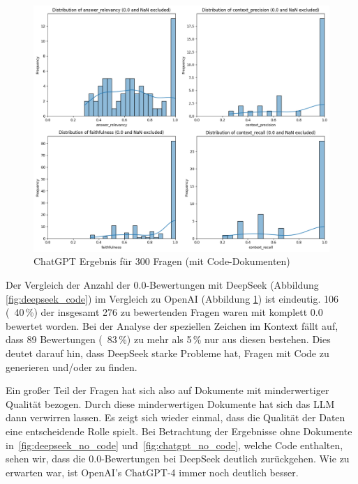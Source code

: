 \begin{figure}[!ht]
    \centering
    \includegraphics[width=1\textwidth]{images/127_44_code_invest_O_O}
    \caption[ChatGPT Metriken für 300 Fragen]{ChatGPT Ergebnis für 300 Fragen (mit Code-Dokumenten)}
    \label{fig:chatgpt_code}
\end{figure}
Der Vergleich der Anzahl der 0.0-Bewertungen mit DeepSeek (Abbildung \ref{fig:deepseek_code}) im Vergleich zu OpenAI (Abbildung \ref{fig:chatgpt_code}) ist eindeutig.
106 (~40\,\%) der insgesamt 276 zu bewertenden Fragen waren mit komplett 0.0 bewertet worden. Bei der Analyse der speziellen Zeichen im Kontext fällt auf, dass 89 Bewertungen (~83\,\%) zu mehr als 5\,\% nur aus diesen bestehen. Dies deutet darauf hin, dass DeepSeek starke Probleme hat, Fragen mit Code zu generieren und/oder zu finden.

Ein großer Teil der Fragen hat sich also auf Dokumente mit minderwertiger Qualität bezogen. Durch diese minderwertigen Dokumente hat sich das LLM dann verwirren lassen.
Es zeigt sich wieder einmal, dass die Qualität der Daten eine entscheidende Rolle spielt.
Bei Betrachtung der Ergebnisse ohne Dokumente in~\ref{fig:deepseek_no_code} und~\ref{fig:chatgpt_no_code}, welche Code enthalten, sehen wir, dass die 0.0-Bewertungen bei DeepSeek deutlich zurückgehen.
Wie zu erwarten war, ist OpenAI's ChatGPT-4 immer noch deutlich besser.

